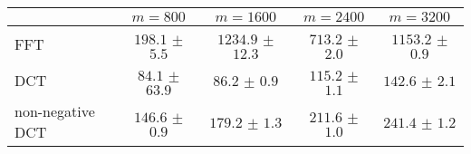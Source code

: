 \centering
\renewcommand{\arraystretch}{1.2}
\begin{tabular}{@{}lcccc@{}}
\toprule
 & $m=800$ & $m=1600$ & $m=2400$ & $m=3200$\\
\midrule
FFT & $198.1$ $\pm$ $5.5$ & $1234.9$ $\pm$ $12.3$ & $713.2$ $\pm$ $2.0$ & $1153.2$ $\pm$ $0.9$ \\
DCT & $84.1$ $\pm$ $63.9$ & $86.2$ $\pm$ $0.9$ & $115.2$ $\pm$ $1.1$ & $142.6$ $\pm$ $2.1$ \\
non-negative DCT & $146.6$ $\pm$ $0.9$ & $179.2$ $\pm$ $1.3$ & $211.6$ $\pm$ $1.0$ & $241.4$ $\pm$ $1.2$ \\
\bottomrule
\end{tabular}
